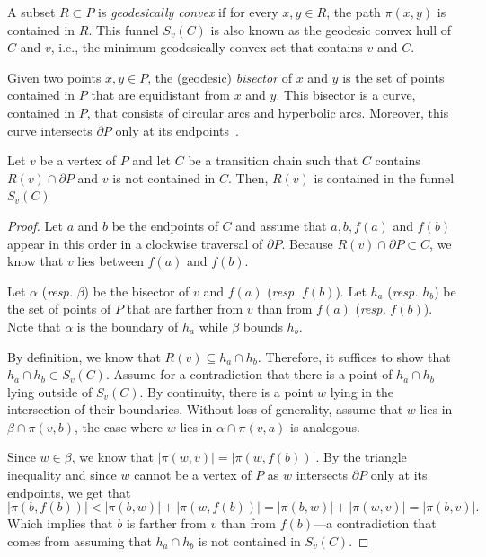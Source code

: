 \documentclass[a4paper,UKenglish]{lipics}
\newcommand{\fn}[2]{\ensuremath{S_{\scriptscriptstyle #1}(#2)}}
\newcommand{\ff}[1]{\ensuremath{f(#1)}}
\newcommand{\g}[2]{\ensuremath{|\pi(#1, #2)|}}
\newcommand{\p}[2]{\ensuremath{\pi(#1, #2)}}
\begin{document}
A subset $R\subset P$ is \emph{geodesically convex} if for every $x,y\in R$, the path $\p{x}{y}$ is contained in $R$.
This funnel $\fn{v}{C}$ is also known as the geodesic convex hull of $C$ and $v$, i.e., the minimum geodesically convex set that contains $v$ and $C$.

Given two points $x,y\in P$, the (geodesic) \emph{bisector} of $x$ and $y$ is the set of points contained in $P$ that are equidistant from $x$ and $y$. This bisector is a curve, contained in $P$, that consists of circular arcs and hyperbolic arcs. Moreover, this curve intersects $\partial P$ only at its endpoints~\cite[Lemma 3.22]{aronov1989geodesic}.

\begin{lemma}\label{lemma:Funnel contains Voronoi region}
Let $v$ be a vertex of $P$ and let $C$ be a transition chain such that $C$ contains $R(v)\cap \partial P$ and $v$ is not contained in $C$.
Then, $R(v)$ is contained in the funnel $\fn{v}{C}$
\end{lemma}
\begin{proof}
Let $a$ and $b$ be the endpoints of $C$ and assume that $a,b, \ff{a}$ and $\ff{b}$ appear in this order in a clockwise traversal of $\partial P$.
Because $R(v)\cap \partial P\subset C$, we know that $v$ lies between $\ff{a}$ and $\ff{b}$.

Let $\alpha$ (\emph{resp.} $\beta$) be the bisector of $v$ and $\ff{a}$ (\emph{resp.} $\ff{b}$).
Let $h_a$ (\emph{resp.} $h_b$) be the set of points of $P$ that are farther from $v$ than from $\ff{a}$ (\emph{resp.} $\ff{b}$).
Note that $\alpha$ is the boundary of $h_a$ while $\beta$ bounds $h_b$.

By definition, we know that $R(v)\subseteq h_a\cap h_b$. Therefore, it suffices to show that $h_a\cap h_b\subset \fn{v}{C}$.
Assume for a contradiction that there is a point of $h_a\cap h_b$ lying outside of $\fn{v}{C}$. By continuity, there is a point $w$ lying in the intersection of their boundaries. 
Without loss of generality, assume that $w$ lies in $\beta \cap \p{v}{b}$, the case where $w$ lies in $\alpha \cap \p{v}{a}$ is analogous. 

Since $w\in \beta$, we know that $\g{w}{v} = \g{w}{ \ff{b}}$. By the triangle inequality and since $w$ cannot be a vertex of $P$ as $w$ intersects $\partial P$ only at its endpoints, we get that
$$\g{b}{\ff{b}} < \g{b}{w} + \g{w}{\ff{b}} = \g{b}{w} + \g{w}{v} = \g{b}{v}.$$
Which implies that $b$ is farther from $v$ than from $\ff{b}$---a contradiction that comes from assuming that $h_a\cap h_b$ is not contained in $\fn{v}{C}$.
\end{proof}
\end{document}
